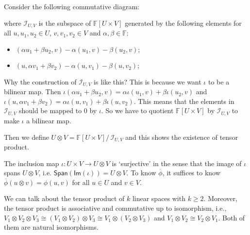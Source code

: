 \documentclass[
	11pt, %
	fleqn, %
	a4paper, %
]{LegrandOrangeBook}
\renewcommand{\Im}[1]{\mathsf{Im}(#1)} %
\renewcommand{\span}[1]{\mathsf{Span}(#1)} %
\renewcommand{\bar}[1]{\overline{#1}} %
\newcommand{\quotient}[2]{#1/\, #2} %
\newcommand{\F}{\mathbb{F}} %
\newcommand{\ideal}{\mathcal{I}} %
\begin{document}
Consider the following commutative diagram:
\begin{center}
\end{center}
where $\ideal_{U, V}$ is the subspace of $\F[U \times V]$ generated by the following elements for all $u, u_1, u_2 \in U$, $v, v_1, v_2 \in V$ and $\alpha, \beta \in \F$:
\begin{itemize}
    \item $(\alpha u_1 + \beta u_2, v) - \alpha (u_1, v) - \beta (u_2, v)$;
    \item $(u, \alpha v_1 + \beta v_2) - \alpha (u, v_1) - \beta (u, v_2)$;
\end{itemize}
Why the construction of $\ideal_{U, V}$ is like this? This is because we want $\iota$ to be a bilinear map. Then $\iota(\alpha u_1 + \beta u_2, v) = \alpha \iota(u_1, v) + \beta \iota(u_2, v)$ and $\iota(u, \alpha v_1 + \beta v_2) = \alpha \iota(u, v_1) + \beta \iota(u, v_2)$. This means that the elements in $\ideal_{U, V}$ should be mapped to $0$ by $\iota$. So we have to quotient $\F[U \times V]$ by $\ideal_{U, V}$ to make $\iota$ a bilinear map.

Then we define $U \otimes V = \quotient{\F[U \times V]}{\ideal_{U, V}}$ and this shows the existence of tensor product.

\begin{remark}
    The inclusion map $\iota : U \times V \to U \otimes V$ is `surjective' in the sense that the image of $\iota$ spans $U \otimes V$, i.e. $\span{\Im{\iota}} = U \otimes V$. To know $\bar{\phi}$, it suffices to know $\bar{\phi}(u \otimes v) = \phi(u, v)$ for all $u \in U$ and $v \in V$.
\end{remark}

We can talk about the tensor product of $k$ linear spaces with $k \geq 2$. Moreover, the tensor product is associative and commutative up to isomorphism, i.e., $V_1 \otimes V_2 \otimes V_3 \cong (V_1 \otimes V_2) \otimes V_3 \cong V_1 \otimes (V_2 \otimes V_3)$ and $V_1 \otimes V_2 \cong V_2 \otimes V_1$. Both of them are natural isomorphisms.
\end{document}
